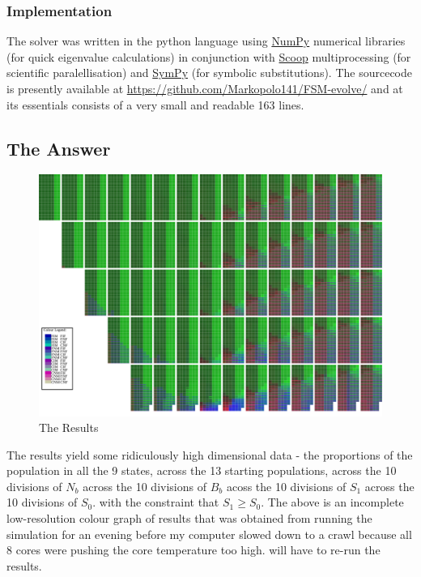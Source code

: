 \documentclass[journal,article,accept,oneauthors,pdftex,10pt,a4paper]{mdpi}
\begin{document}
\subsubsection{Implementation}

The solver was written in the python language using \href{http://www.numpy.org/}{NumPy} numerical libraries (for quick eigenvalue calculations) in conjunction with \href{http://pyscoop.org/}{Scoop} multiprocessing (for scientific paralellisation) and \href{http://www.sympy.org/}{SymPy} (for symbolic substitutions). The sourcecode is presently available at \href{https://github.com/Markopolo141/FSM-evolve/}{https://github.com/Markopolo141/FSM-evolve/} and at its essentials consists of a very small and readable 163 lines.

\subsection{The Answer}

\begin{figure}[ht]
\centering
\includegraphics[width=1.0\linewidth]{outcome}
\caption{The Results}
\label{fig:states}
\end{figure}

The results yield some ridiculously high dimensional data - the proportions of the population in all the 9 states, across the 13 starting populations, across the 10 divisions of $N_b$ across the 10 divisions of $B_b$ acoss the 10 divisions of $S_1$ across the 10 divisions of $S_0$. with the constraint that $S_1\ge S_0$.
The above is an incomplete low-resolution colour graph of results that was obtained from running the simulation for an evening before my computer slowed down to a crawl because all 8 cores were pushing the core temperature too high.
will have to re-run the results.
\end{document}
